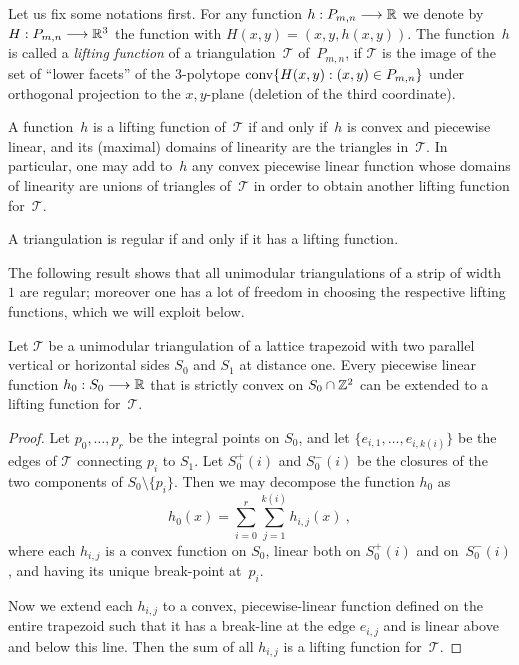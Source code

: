 Let us fix some notations first.  For any function
$h:P_{m,n}\longrightarrow\mathbb{R}$ we denote by
$H:P_{m,n}\longrightarrow\mathbb{R}^3$ the function with
$H(x,y)=(x,y,h(x,y))$. The function~$h$ is called a \emph{lifting
  function} of a triangulation~$\mathcal{T}$ of~$P_{m,n}$, if
$\mathcal{T}$ is the image of the set of ``lower facets'' of the
$3$-polytope $\mbox{\rm conv}\{H(x,y):(x,y)\in P_{m,n}\}$ under orthogonal
projection to the $x,y$-plane (deletion of the third coordinate).

A function~$h$ is a lifting function of~$\mathcal{T}$ if and only
if~$h$ is convex and piecewise linear, and its (maximal) domains of
linearity are the triangles in~$\mathcal{T}$. In particular, one may
add to~$h$ any convex piecewise linear function whose domains of linearity
are unions of triangles of~$\mathcal{T}$ in order to obtain another
lifting function for~$\mathcal{T}$.

A triangulation is regular if and only if it has a lifting function.

The following result shows that all unimodular triangulations of a
strip of width $1$ are regular; moreover one has a lot of freedom in
choosing the respective lifting functions, which we will exploit
below.

\begin{lemma}
  \label{lem:stripreg}
  Let $\mathcal{T}$ be a unimodular triangulation of a lattice
  trapezoid with two parallel vertical or horizontal sides $S_0$ and
  $S_1$ at distance one. Every piecewise linear function
  $h_0:S_0\longrightarrow\mathbb{R}$ that is strictly convex on $S_0\cap\mathbb{Z}^2$
  can be extended to a lifting function for~$\mathcal{T}$.
\end{lemma}

\begin{proof}
  Let $p_0,\dots,p_r$ be the integral points on $S_0$, and let
  $\{e_{i,1},\dots,e_{i,k(i)}\}$ be the edges of $\mathcal{T}$
  connecting $p_i$ to $S_1$. Let $S_0^+(i)$ and $S_0^-(i)$ be the
  closures of the two components of $S_0\setminus\{p_i\}$. Then we may
  decompose the function $h_0$ as
  $$
  h_0(x)=\sum_{i=0}^r\sum_{j=1}^{k(i)}h_{i,j}(x)\ ,
  $$
  where each $h_{i,j}$ is a convex function on $S_0$, linear both
  on $S_0^+(i)$ and on~$S_0^-(i)$, and having its  unique break-point
  at~$p_i$.

  Now we extend each $h_{i,j}$ to a convex, piecewise-linear function
  defined on the entire trapezoid such that
  it has a break-line at the edge $e_{i,j}$ and is linear above
  and below this line.
  Then the sum of all $h_{i,j}$ is a lifting function for~$\mathcal{T}$.
\end{proof}


